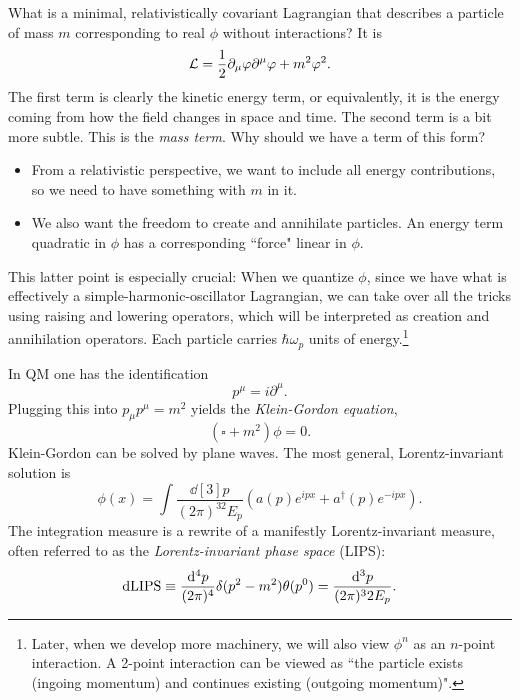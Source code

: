 What is a minimal, relativistically covariant Lagrangian that describes a particle
of mass $m$ corresponding to real $\phi$ without interactions? It is
\begin{equation}\label{eq:simpleScalarLagr}
\mathcal{L}=\frac{1}{2}\partial_\mu\varphi\partial^\mu\varphi+m^2\varphi^2.
\end{equation}
The first term is clearly the kinetic energy term, or equivalently, it is the
energy coming from how the field changes in space and time. The second term is a
bit more subtle. This is the {\it mass term}. Why should we
have a term of this form?
\begin{itemize}
\item From a relativistic perspective, we want to include all energy contributions, so we
need to have something with $m$ in it. 
\item We also want the freedom to create and annihilate particles. An energy
term quadratic in $\phi$ has a corresponding ``force" linear in $\phi$.
\end{itemize}
This latter point is especially crucial: When we quantize $\phi$, since we have
what is effectively a simple-harmonic-oscillator Lagrangian, we can take over
all the tricks using raising and lowering operators, which will be interpreted
as creation and annihilation operators. Each particle carries $\hbar\omega_p$
units of energy.\footnote{Later, when we develop more machinery, we will also
view $\phi^n$ as an $n$-point interaction. A 2-point interaction can be viewed
as ``the particle exists (ingoing momentum) and continues existing (outgoing
momentum)".}

In QM one has the identification
\begin{equation}
p^\mu=i\partial^\mu.
\end{equation}
Plugging this into $p_\mu p^\mu=m^2$ yields the {\it
Klein-Gordon equation},
\begin{equation}
\left(\square +m^2\right)\phi=0.
\end{equation}
Klein-Gordon can be solved by plane waves. The most general,
Lorentz-invariant solution is
\begin{equation}
\phi(x)=\int\frac{\dd[3]{p}}{(2\pi)^32E_p}
\left(a(p)e^{ipx}+a^\dagger(p)e^{-ipx}\right).
\end{equation}
The integration measure is a rewrite of a manifestly Lorentz-invariant measure,
often referred to as the {\it Lorentz-invariant phase space} (LIPS):
\begin{equation}
\dd{\rm LIPS}\equiv\frac{\dd[4]{p}}{(2\pi)^4}\delta(p^2-m^2)\theta(p^0)
=\frac{\dd[3]{p}}{(2\pi)^32E_p}.
\end{equation}


